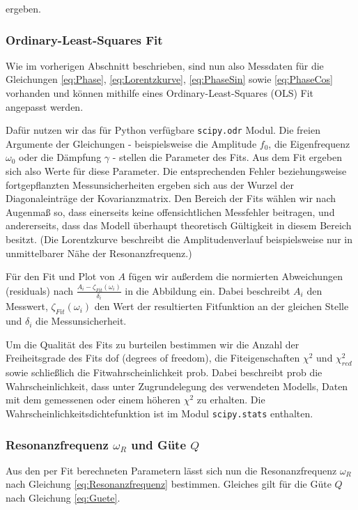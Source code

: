 ergeben.

\subsubsection*{Ordinary-Least-Squares Fit}

Wie im vorherigen Abschnitt beschrieben, sind nun also Messdaten für die Gleichungen \ref{eq:Phase}, \ref{eq:Lorentzkurve}, \ref{eq:PhaseSin} sowie \ref{eq:PhaseCos} vorhanden und können mithilfe eines Ordinary-Least-Squares (OLS) Fit angepasst werden.

Dafür nutzen wir das für Python verfügbare \texttt{scipy.odr} Modul.
Die freien Argumente der Gleichungen - beispielsweise die Amplitude $f_0$, die Eigenfrequenz $\omega_0$ oder die Dämpfung $\gamma$ - stellen die Parameter des Fits.
Aus dem Fit ergeben sich also Werte für diese Parameter.
Die entsprechenden Fehler beziehungsweise fortgepflanzten Messunsicherheiten ergeben sich aus der Wurzel der Diagonaleinträge der Kovarianzmatrix.
Den Bereich der Fits wählen wir nach Augenmaß so, dass einerseits keine offensichtlichen Messfehler beitragen, und andererseits, dass das Modell überhaupt theoretisch Gültigkeit in diesem Bereich besitzt.
(Die Lorentzkurve beschreibt die Amplitudenverlauf beispielsweise nur in unmittelbarer Nähe der Resonanzfrequenz.)

Für den Fit und Plot von $A$ fügen wir außerdem die normierten Abweichungen (residuals) nach $\frac{A_i - \zeta_{Fit}(\omega_i)}{\delta_i}$ in die Abbildung ein.
Dabei beschreibt $A_i$ den Messwert, $\zeta_{Fit}(\omega_i)$ den Wert der resultierten Fitfunktion an der gleichen Stelle und $\delta_i$ die Messunsicherheit.

Um die Qualität des Fits zu burteilen bestimmen wir die Anzahl der Freiheitsgrade des Fits dof (degrees of freedom), die Fiteigenschaften $\chi^2$ und $\chi^2_{red}$ sowie schließlich die Fitwahrscheinlichkeit prob.
Dabei beschreibt prob die Wahrscheinlichkeit, dass unter Zugrundelegung des verwendeten Modells, Daten mit dem gemessenen oder einem höheren $\chi^2$ zu erhalten.
Die Wahrscheinlichkeitsdichtefunktion ist im Modul \texttt{scipy.stats} enthalten.

\subsubsection*{Resonanzfrequenz $\omega_R$ und Güte $Q$}

Aus den per Fit berechneten Parametern lässt sich nun die Resonanzfrequenz $\omega_R$ nach Gleichung \ref{eq:Resonanzfrequenz} bestimmen.
Gleiches gilt für die Güte $Q$ nach Gleichung \ref{eq:Guete}.

